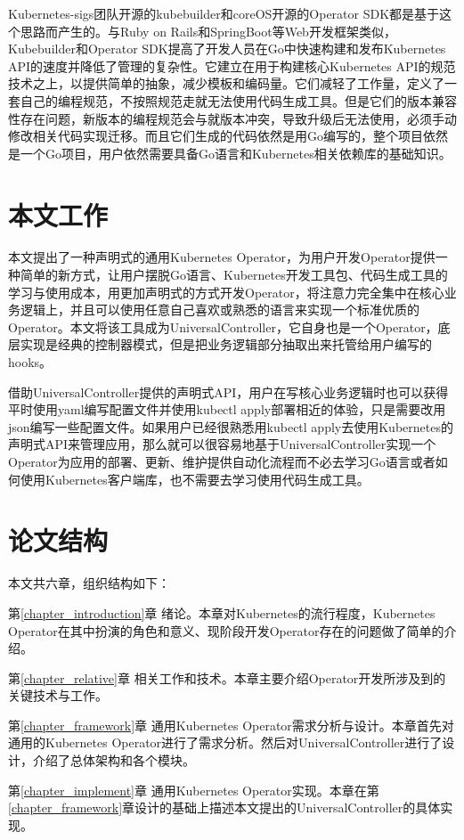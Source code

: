 \documentclass[macfonts,master]{njuthesis}
\begin{document}
Kubernetes-sigs团队开源的kubebuilder和coreOS开源的Operator SDK都是基于这个思路而产生的。与Ruby on Rails和SpringBoot等Web开发框架类似，Kubebuilder和Operator SDK提高了开发人员在Go中快速构建和发布Kubernetes API的速度并降低了管理的复杂性。它建立在用于构建核心Kubernetes API的规范技术之上，以提供简单的抽象，减少模板和编码量。它们减轻了工作量，定义了一套自己的编程规范，不按照规范走就无法使用代码生成工具。但是它们的版本兼容性存在问题，新版本的编程规范会与就版本冲突，导致升级后无法使用，必须手动修改相关代码实现迁移。而且它们生成的代码依然是用Go编写的，整个项目依然是一个Go项目，用户依然需要具备Go语言和Kubernetes相关依赖库的基础知识。

\section{本文工作}
本文提出了一种声明式的通用Kubernetes Operator，为用户开发Operator提供一种简单的新方式，让用户摆脱Go语言、Kubernetes开发工具包、代码生成工具的学习与使用成本，用更加声明式的方式开发Operator，将注意力完全集中在核心业务逻辑上，并且可以使用任意自己喜欢或熟悉的语言来实现一个标准优质的Operator。本文将该工具成为UniversalController，它自身也是一个Operator，底层实现是经典的控制器模式，但是把业务逻辑部分抽取出来托管给用户编写的hooks。

借助UniversalController提供的声明式API，用户在写核心业务逻辑时也可以获得平时使用yaml编写配置文件并使用kubectl apply部署相近的体验，只是需要改用json编写一些配置文件。如果用户已经很熟悉用kubectl apply去使用Kubernetes的声明式API来管理应用，那么就可以很容易地基于UniversalController实现一个Operator为应用的部署、更新、维护提供自动化流程而不必去学习Go语言或者如何使用Kubernetes客户端库，也不需要去学习使用代码生成工具。

\section{论文结构}
本文共六章，组织结构如下：

第\ref{chapter_introduction}章 绪论。本章对Kubernetes的流行程度，Kubernetes Operator在其中扮演的角色和意义、现阶段开发Operator存在的问题做了简单的介绍。

第\ref{chapter_relative}章 相关工作和技术。本章主要介绍Operator开发所涉及到的关键技术与工作。

第\ref{chapter_framework}章 通用Kubernetes Operator需求分析与设计。本章首先对通用的Kubernetes Operator进行了需求分析。然后对UniversalController进行了设计，介绍了总体架构和各个模块。

第\ref{chapter_implement}章 通用Kubernetes Operator实现。本章在第\ref{chapter_framework}章设计的基础上描述本文提出的UniversalController的具体实现。
\end{document}
